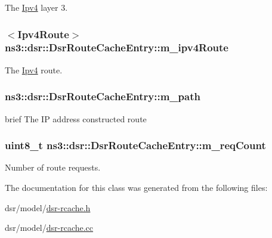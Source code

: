 The \hyperlink{classns3_1_1Ipv4}{Ipv4} layer 3. 

\subsubsection[{\texorpdfstring{m\+\_\+ipv4\+Route}{m_ipv4Route}}]{$<${\bf Ipv4\+Route}$>$ ns3\+::dsr\+::\+Dsr\+Route\+Cache\+Entry\+::m\+\_\+ipv4\+Route\hspace{0.3cm}{\ttfamily [private]}}\hypertarget{classns3_1_1dsr_1_1DsrRouteCacheEntry_a7697648c057a5b91c304c76998c89373}{}\label{classns3_1_1dsr_1_1DsrRouteCacheEntry_a7697648c057a5b91c304c76998c89373}


The \hyperlink{classns3_1_1Ipv4}{Ipv4} route. 

\subsubsection[{\texorpdfstring{m\+\_\+path}{m_path}}]{ ns3\+::dsr\+::\+Dsr\+Route\+Cache\+Entry\+::m\+\_\+path\hspace{0.3cm}{\ttfamily [private]}}\hypertarget{classns3_1_1dsr_1_1DsrRouteCacheEntry_a58391601372b1dbd097813c41923fcc1}{}\label{classns3_1_1dsr_1_1DsrRouteCacheEntry_a58391601372b1dbd097813c41923fcc1}


brief The IP address constructed route 

\subsubsection[{\texorpdfstring{m\+\_\+req\+Count}{m_reqCount}}]{\setlength{\rightskip}{0pt plus 5cm}uint8\+\_\+t ns3\+::dsr\+::\+Dsr\+Route\+Cache\+Entry\+::m\+\_\+req\+Count\hspace{0.3cm}{\ttfamily [private]}}\hypertarget{classns3_1_1dsr_1_1DsrRouteCacheEntry_a7c85df057c3652d168519991b92616f2}{}\label{classns3_1_1dsr_1_1DsrRouteCacheEntry_a7c85df057c3652d168519991b92616f2}


Number of route requests. 



The documentation for this class was generated from the following files\+:\begin{DoxyCompactItemize}
\item 
dsr/model/\hyperlink{dsr-rcache_8h}{dsr-\/rcache.\+h}\item 
dsr/model/\hyperlink{dsr-rcache_8cc}{dsr-\/rcache.\+cc}\end{DoxyCompactItemize}
